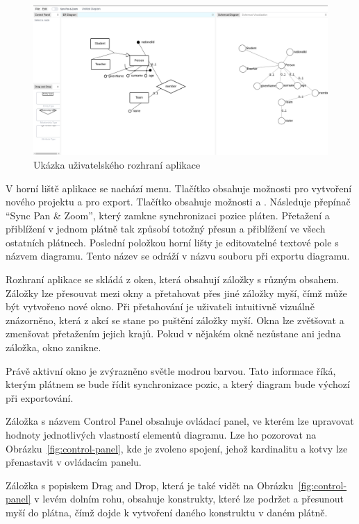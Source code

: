 \begin{figure}[!htb]
  \centering
  \includegraphics[width=\maxwidth{\textwidth}]{../img/app/user-interface.png}
  \caption{Ukázka uživatelského rozhraní aplikace}
  \label{fig:user-interface}
\end{figure}

V horní liště aplikace se nachází menu.
Tlačítko  obsahuje možnosti pro vytvoření nového projektu a pro export.
Tlačítko  obsahuje možnosti  a .
Následuje přepínač \enquote{Sync Pan \& Zoom}, který zamkne synchronizaci pozice pláten.
Přetažení a přiblížení v jednom plátně tak způsobí totožný přesun a přiblížení ve všech ostatních plátnech.
Poslední položkou horní lišty je editovatelné textové pole s názvem diagramu.
Tento název se odráží v názvu souboru při exportu diagramu.

Rozhraní aplikace se skládá z oken, která obsahují záložky s různým obsahem.
Záložky lze přesouvat mezi okny a přetahovat přes jiné záložky myší, čímž může být vytvořeno nové okno.
Při přetahování je uživateli intuitivně vizuálně znázorněno, která z akcí se stane po puštění záložky myší.
Okna lze zvětšovat a zmenšovat přetažením jejich krajů.
Pokud v nějakém okně nezůstane ani jedna záložka, okno zanikne.

Právě aktivní okno je zvýrazněno světle modrou barvou.
Tato informace říká, kterým plátnem se bude řídit synchronizace pozic, a který diagram bude výchozí při exportování.

Záložka s názvem Control Panel obsahuje ovládací panel, ve kterém lze upravovat hodnoty jednotlivých vlastností elementů diagramu.
Lze ho pozorovat na Obrázku~\ref{fig:control-panel}, kde je zvoleno spojení, jehož kardinalitu a kotvy lze přenastavit v ovládacím panelu.

Záložka s popiskem Drag and Drop, která je také vidět na Obrázku~\ref{fig:control-panel} v levém dolním rohu, obsahuje konstrukty, které lze podržet a přesunout myší do plátna, čímž dojde k vytvoření daného konstruktu v daném plátně.

